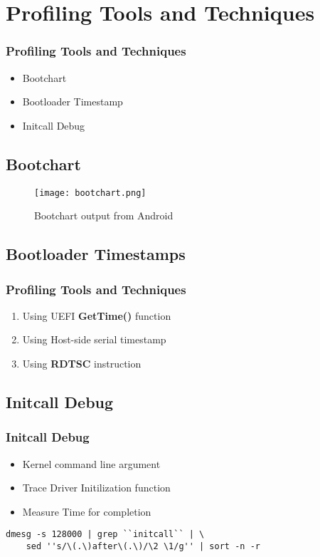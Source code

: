 

\section{Profiling Tools and Techniques}
\label{prof_tools_techniques}


\begin{frame}
	\frametitle{Profiling Tools and Techniques}
	\begin{itemize}
		\item Bootchart \pause
		\item Bootloader Timestamp \pause
		\item Initcall Debug \pause
	\end{itemize}
\end{frame}

\subsection{Bootchart}

\begin{frame}
\begin{figure}[h]
  \centering
    \texttt{[image: bootchart.png]}
    \caption{Bootchart output from Android}
    \label{fig:android_boot}
\end{figure}
\end{frame}

\subsection{Bootloader Timestamps}

\begin{frame}
	\frametitle{Profiling Tools and Techniques}
\begin{enumerate}
	\item Using UEFI {\bf GetTime()} function \pause
	\item Using Host-side serial timestamp \pause
	\item Using {\bf RDTSC} instruction \pause
\end{enumerate}
\end{frame}


\subsection {Initcall Debug}

\begin{frame}[fragile]
	\frametitle{Initcall Debug}
	\begin{itemize}
		\item Kernel command line argument \pause
		\item Trace Driver Initilization function \pause
		\item Measure Time for completion \pause
	\end{itemize}
	\begin{Verbatim}[fontsize=\small]
	dmesg -s 128000 | grep ``initcall`` | \ 
	sed ''s/\(.\)after\(.\)/\2 \1/g'' | sort -n -r
	\end{Verbatim}
\end{frame}


